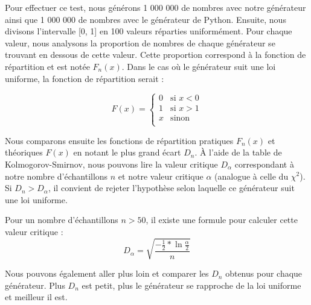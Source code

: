 \documentclass[10pt,a4paper]{article}
\begin{document}
	Pour effectuer ce test, nous générons 1 000 000 de nombres avec notre générateur ainsi que 1 000 000 de nombres avec le générateur de Python.
	Ensuite, nous divisons l'intervalle [0, 1] en 100 valeurs réparties uniformément.
	Pour chaque valeur, nous analysons la proportion de nombres de chaque générateur se trouvant en dessous de cette valeur.
	Cette proportion correspond à la fonction de répartition et est notée $F_n(x)$.
	Dans le cas où le générateur suit une loi uniforme, la fonction de répartition serait :
	
	\begin{equation*}
		F(x) = 
		\begin{cases}
			0 & \text{si } x < 0 \\
			1 & \text{si } x > 1\\
			x & \text{sinon }\\
		\end{cases}
	\end{equation*}
	
	Nous comparons ensuite les fonctions de répartition pratiques $F_n(x)$ et théoriques $F(x)$ en notant le plus grand écart $D_n$. 
	À l'aide de la table de Kolmogorov-Smirnov, nous pouvons lire la valeur critique $D_\alpha$ correspondant à notre nombre d'échantillons $n$ et notre valeur critique $\alpha$ (analogue à celle du $\chi^2$).
	Si $D_n > D_\alpha$, il convient de rejeter l'hypothèse selon laquelle ce générateur suit une loi uniforme.
	
	Pour un nombre d'échantillons $n > 50$, il existe une formule pour calculer cette valeur critique :
	\begin{equation*}
		D_\alpha = \sqrt{
			\frac{
			- \frac{1}{2} * \ln{\frac{\alpha}{2}}
			}{n}
		}
	\end{equation*}
	
	Nous pouvons également aller plus loin et comparer les $D_n$ obtenus pour chaque générateur. Plus $D_n$ est petit, plus le générateur se rapproche de la loi uniforme et meilleur il est.
	
\end{document}
